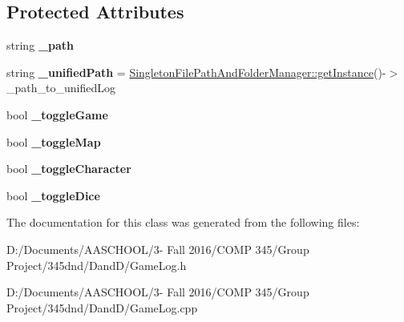 \subsection*{Protected Attributes}
\begin{DoxyCompactItemize}
\item 
\hypertarget{class_game_log_a2672e6d19a0cbf9002cb256dc1c82c27}{}\label{class_game_log_a2672e6d19a0cbf9002cb256dc1c82c27} 
string {\bfseries \+\_\+path}
\item 
\hypertarget{class_game_log_ab2732a2001de1ef06a79a8ca8073634c}{}\label{class_game_log_ab2732a2001de1ef06a79a8ca8073634c} 
string {\bfseries \+\_\+unified\+Path} = \hyperlink{class_singleton_file_path_and_folder_manager_abc622181f66ffdc08d17f728854b0e2b}{Singleton\+File\+Path\+And\+Folder\+Manager\+::get\+Instance}()-\/$>$\+\_\+path\+\_\+to\+\_\+unified\+Log
\item 
\hypertarget{class_game_log_a9c65b3faffabd03cb575d69d8e9956ba}{}\label{class_game_log_a9c65b3faffabd03cb575d69d8e9956ba} 
bool {\bfseries \+\_\+toggle\+Game}
\item 
\hypertarget{class_game_log_affaac4d5666a56f771fd554fc457a7f8}{}\label{class_game_log_affaac4d5666a56f771fd554fc457a7f8} 
bool {\bfseries \+\_\+toggle\+Map}
\item 
\hypertarget{class_game_log_a38ff576ac20919bf77327bbffdb22c1f}{}\label{class_game_log_a38ff576ac20919bf77327bbffdb22c1f} 
bool {\bfseries \+\_\+toggle\+Character}
\item 
\hypertarget{class_game_log_a6a6f3d9cc25a158d3810445a367a5004}{}\label{class_game_log_a6a6f3d9cc25a158d3810445a367a5004} 
bool {\bfseries \+\_\+toggle\+Dice}
\end{DoxyCompactItemize}


The documentation for this class was generated from the following files\+:\begin{DoxyCompactItemize}
\item 
D\+:/\+Documents/\+A\+A\+S\+C\+H\+O\+O\+L/3-\/ Fall 2016/\+C\+O\+M\+P 345/\+Group Project/345dnd/\+Dand\+D/Game\+Log.\+h\item 
D\+:/\+Documents/\+A\+A\+S\+C\+H\+O\+O\+L/3-\/ Fall 2016/\+C\+O\+M\+P 345/\+Group Project/345dnd/\+Dand\+D/Game\+Log.\+cpp\end{DoxyCompactItemize}
